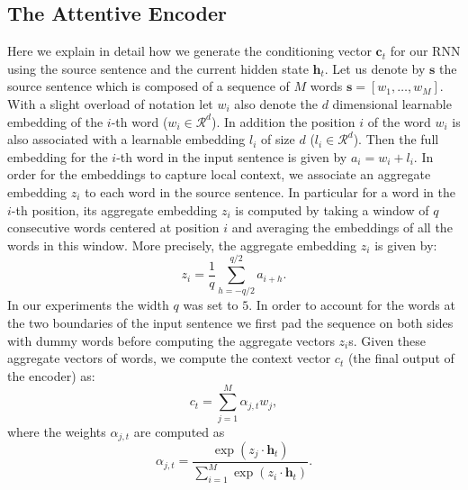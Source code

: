 \documentclass{article} \usepackage{iclr2016_conference,times}
\newcommand{\bh}{\mathbf{h}}
\newcommand{\bc}{\mathbf{c}}
\newcommand{\bs}{\mathbf{s}}
\newcommand{\setr}{\mathcal{R}}
\begin{document}
\subsection{The Attentive Encoder}
\label{sup-material:encoder}
Here we explain in detail how we generate the conditioning vector $\bc_t$ 
for our RNN using the source sentence and the current hidden state $\bh_t$. 
Let us denote by $\bs$ the source sentence which is composed of a sequence 
of $M$ words $\bs = [w_1, \ldots, w_M]$. 
With a slight overload of notation let $w_i$ also denote the $d$ dimensional 
learnable embedding of the $i$-th word ($w_i \in \setr^d$). In addition the 
position $i$ of the word $w_i$ is also associated with a learnable embedding $l_i$ 
of size $d$ ($l_i \in \setr^d$). Then the full embedding for 
the $i$-th word in the input sentence is given by $a_i = w_i + l_i$. 
In order for the embeddings to capture local context, we associate an 
aggregate embedding $z_i$ to each word in the source sentence. 
In particular for a word in the $i$-th position, its aggregate embedding 
$z_i$ is computed by taking a window of $q$ consecutive words centered 
at position $i$ and averaging the embeddings of all the words in this window. More precisely, the aggregate embedding $z_i$ is given by: 
\begin{equation}
z_i = \frac{1}{q} \sum_{h = -q/2}^{q/2} a_{i + h}. 
\end{equation}
In our experiments the width $q$ was set to $5$. 
In order to account for the words at the two boundaries of the input 
sentence we first pad the sequence on both sides with dummy words before 
computing the aggregate vectors $z_i$s. Given these aggregate vectors of words, we compute 
the context vector $c_t$ (the final output of the encoder) as: 
\begin{equation}
c_t = \sum_{j=1}^M \alpha_{j,t} w_j, 
\end{equation}
where the weights $\alpha_{j, t}$ are computed as 
\begin{equation}
\alpha_{j, t} = \frac{\exp(z_j \cdot \bh_{t})}{\sum_{i=1}^M \exp(z_i \cdot \bh_{t})}.
\end{equation}
\end{document}
